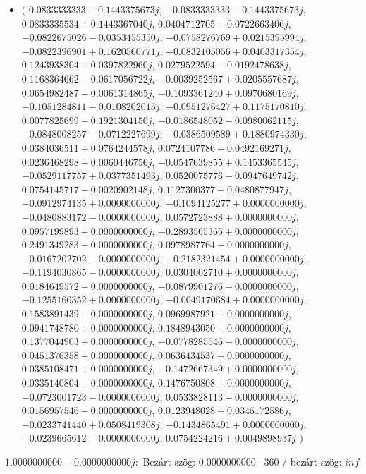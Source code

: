 \documentclass[14pt,a4paper]{article}
\begin{document}
\begin{itemize}
\item
$\big($
$0.0833333333-0.1443375673j$, $-0.0833333333-0.1443375673j$, $0.0833335534+0.1443367040j$, $0.0404712705-0.0722663406j$, $-0.0822675026-0.0353455350j$, $-0.0758276769+0.0215395994j$, $-0.0822396901+0.1620560771j$, $-0.0832105056+0.0403317354j$, $0.1243938304+0.0397822960j$, $0.0279522594+0.0192478638j$, $0.1168364662-0.0617056722j$, $-0.0039252567+0.0205557687j$, $0.0654982487-0.0061314865j$, $-0.1093361240+0.0970680169j$, $-0.1051284811-0.0108202015j$, $-0.0951276427+0.1175170810j$, $0.0077825699-0.1921304150j$, $-0.0186548052-0.0980062115j$, $-0.0848008257-0.0712227699j$, $-0.0386509589+0.1880974330j$, $0.0384036511+0.0764244578j$, $0.0724107786-0.0492169271j$, $0.0236468298-0.0060446756j$, $-0.0547639855+0.1453365545j$, $-0.0529117757+0.0377351493j$, $0.0520075776-0.0947649742j$, $0.0754145717-0.0020902148j$, $0.1127300377+0.0480877947j$, $-0.0912974135+0.0000000000j$, $-0.1094125277+0.0000000000j$, $-0.0480883172-0.0000000000j$, $0.0572723888+0.0000000000j$, $0.0957199893+0.0000000000j$, $-0.2893565365+0.0000000000j$, $0.2491349283-0.0000000000j$, $0.0978987764-0.0000000000j$, $-0.0167202702-0.0000000000j$, $-0.2182321454+0.0000000000j$, $-0.1194030865-0.0000000000j$, $0.0304002710+0.0000000000j$, $0.0184649572-0.0000000000j$, $-0.0879901276-0.0000000000j$, $-0.1255160352+0.0000000000j$, $-0.0049170684+0.0000000000j$, $0.1583891439-0.0000000000j$, $0.0969987921+0.0000000000j$, $0.0941748780+0.0000000000j$, $0.1848943050+0.0000000000j$, $0.1377044903+0.0000000000j$, $-0.0778285546-0.0000000000j$, $0.0451376358+0.0000000000j$, $0.0636434537+0.0000000000j$, $0.0385108471+0.0000000000j$, $-0.1472667349+0.0000000000j$, $0.0335140804-0.0000000000j$, $0.1476750808+0.0000000000j$, $-0.0723001723-0.0000000000j$, $0.0533828113-0.0000000000j$, $0.0156957546-0.0000000000j$, $0.0123948028+0.0345172586j$, $-0.0233741440+0.0508419308j$, $-0.1434865491+0.0000000000j$, $-0.0239665612-0.0000000000j$, $0.0754224216+0.0049898937j$
$\big)$
\end{itemize}
$1.0000000000+0.0000000000j$:\
Bezárt szög: $0.0000000000$ \
360 / bezárt szög: $inf$\
\end{document}
